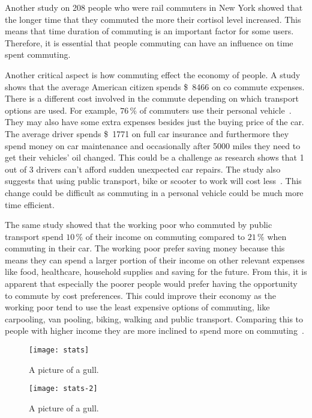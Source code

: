 Another study on 208 people who were rail commuters in New York showed that the longer time that they commuted the more
their cortisol level increased.
This means that time duration of commuting is an important factor for some users.
Therefore, it is essential that people commuting can have an influence on time spent commuting.

Another critical aspect is how commuting effect the economy of people.
A study shows that the average American citizen spends \SI{8466}[\$]{} on co commute expenses.
There is a different cost involved in the commute depending on which transport options are used.
For example, \(76\,\%\) of commuters use their personal vehicle~\cite{bankrate2023}.
They may also have some extra expenses besides just the buying price of the car.
The average driver spends \SI{1771}[\$]{} on full car insurance and furthermore they spend money on car maintenance
and occasionally after 5000 miles they need to get their vehicles' oil changed.
This could be a challenge as research shows that 1 out of 3 drivers can't afford sudden unexpected car repairs.
The study also suggests that using public transport, bike or scooter to work will cost less~\cite{bankrate2023}.
This change could be difficult as commuting in a personal vehicle could be much more time efficient.

The same study showed that the working poor who commuted by public transport spend \(10\,\%\) of their income on
commuting compared to \(21\,\%\) when commuting in their car.
The working poor prefer saving money because this means they can spend a larger portion of their income on other
relevant expenses like food, healthcare, household supplies and saving for the future.
From this, it is apparent that especially the poorer people would prefer having the opportunity to
commute by cost preferences.
This could improve their economy as the working poor tend to use the least expensive options of commuting, like
carpooling, van pooling, biking, walking and public transport.
Comparing this to people with higher income they are more inclined to spend more on commuting~\cite{bankrate2023}.

\begin{figure}
    \centering
    \texttt{[image: stats]}
    \caption{A picture of a gull.}
    \label{fig:figure}
\end{figure}

\begin{figure}
    \texttt{[image: stats-2]}
    \caption{A picture of a gull.}
    \label{fig:figure2}
\end{figure}
